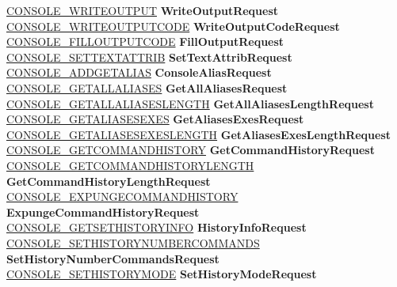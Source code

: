 \begin{DoxyCompactItemize}
\begin{tabbing}
\>\hyperlink{struct___c_o_n_s_o_l_e___w_r_i_t_e_o_u_t_p_u_t}{CONSOLE\_WRITEOUTPUT} {\bfseries WriteOutputRequest}\\
\>\hyperlink{struct___c_o_n_s_o_l_e___o_u_t_p_u_t_c_o_d_e}{CONSOLE\_WRITEOUTPUTCODE} {\bfseries WriteOutputCodeRequest}\\
\>\hyperlink{struct___c_o_n_s_o_l_e___f_i_l_l_o_u_t_p_u_t_c_o_d_e}{CONSOLE\_FILLOUTPUTCODE} {\bfseries FillOutputRequest}\\
\>\hyperlink{struct___c_o_n_s_o_l_e___s_e_t_t_e_x_t_a_t_t_r_i_b}{CONSOLE\_SETTEXTATTRIB} {\bfseries SetTextAttribRequest}\\
\>\hyperlink{struct___c_o_n_s_o_l_e___a_d_d_g_e_t_a_l_i_a_s}{CONSOLE\_ADDGETALIAS} {\bfseries ConsoleAliasRequest}\\
\>\hyperlink{struct___c_o_n_s_o_l_e___g_e_t_a_l_l_a_l_i_a_s_e_s}{CONSOLE\_GETALLALIASES} {\bfseries GetAllAliasesRequest}\\
\>\hyperlink{struct___c_o_n_s_o_l_e___g_e_t_a_l_l_a_l_i_a_s_e_s_l_e_n_g_t_h}{CONSOLE\_GETALLALIASESLENGTH} {\bfseries GetAllAliasesLengthRequest}\\
\>\hyperlink{struct___c_o_n_s_o_l_e___g_e_t_a_l_i_a_s_e_s_e_x_e_s}{CONSOLE\_GETALIASESEXES} {\bfseries GetAliasesExesRequest}\\
\>\hyperlink{struct___c_o_n_s_o_l_e___g_e_t_a_l_i_a_s_e_s_e_x_e_s_l_e_n_g_t_h}{CONSOLE\_GETALIASESEXESLENGTH} {\bfseries GetAliasesExesLengthRequest}\\
\>\hyperlink{struct___c_o_n_s_o_l_e___g_e_t_c_o_m_m_a_n_d_h_i_s_t_o_r_y}{CONSOLE\_GETCOMMANDHISTORY} {\bfseries GetCommandHistoryRequest}\\
\>\hyperlink{struct___c_o_n_s_o_l_e___g_e_t_c_o_m_m_a_n_d_h_i_s_t_o_r_y_l_e_n_g_t_h}{CONSOLE\_GETCOMMANDHISTORYLENGTH} {\bfseries GetCommandHistoryLengthRequest}\\
\>\hyperlink{struct___c_o_n_s_o_l_e___e_x_p_u_n_g_e_c_o_m_m_a_n_d_h_i_s_t_o_r_y}{CONSOLE\_EXPUNGECOMMANDHISTORY} {\bfseries ExpungeCommandHistoryRequest}\\
\>\hyperlink{struct___c_o_n_s_o_l_e___g_e_t_s_e_t_h_i_s_t_o_r_y_i_n_f_o}{CONSOLE\_GETSETHISTORYINFO} {\bfseries HistoryInfoRequest}\\
\>\hyperlink{struct___c_o_n_s_o_l_e___s_e_t_h_i_s_t_o_r_y_n_u_m_b_e_r_c_o_m_m_a_n_d_s}{CONSOLE\_SETHISTORYNUMBERCOMMANDS} {\bfseries SetHistoryNumberCommandsRequest}\\
\>\hyperlink{struct___c_o_n_s_o_l_e___s_e_t_h_i_s_t_o_r_y_m_o_d_e}{CONSOLE\_SETHISTORYMODE} {\bfseries SetHistoryModeRequest}\\

\end{tabbing}
\end{DoxyCompactItemize}
